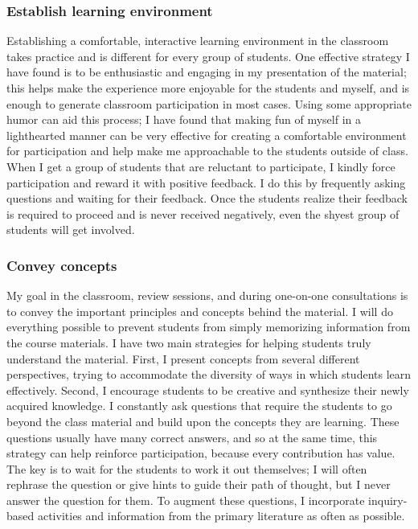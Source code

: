 \documentclass[10pt]{article}
\begin{document}
\subsubsection*{Establish learning environment}
Establishing a comfortable, interactive learning environment in the classroom takes practice and is different for every group of students.
One effective strategy I have found is to be enthusiastic and engaging in my presentation of the material; this helps make the experience more enjoyable for the students and myself, and is enough to generate classroom participation in most cases.
Using some appropriate humor can aid this process; I have found that making fun of myself in a lighthearted manner can be very effective for creating a comfortable environment for participation and help make me approachable to the students outside of class.
When I get a group of students that are reluctant to participate, I kindly force participation and reward it with positive feedback.
I do this by frequently asking questions and waiting for their feedback.
Once the students realize their feedback is required to proceed and is never received negatively, even the shyest group of students will get involved.

\subsubsection*{Convey concepts}
My goal in the classroom, review sessions, and during one-on-one consultations is to convey the important principles and concepts behind the material.
I will do everything possible to prevent students from simply memorizing information from the course materials.
I have two main strategies for helping students truly understand the material.
First, I present concepts from several different perspectives, trying to accommodate the diversity of ways in which students learn effectively.
Second, I encourage students to be creative and synthesize their newly acquired knowledge.
I constantly ask questions that require the students to go beyond the class material and build upon the concepts they are learning.
These questions usually have many correct answers, and so at the same time, this strategy can help reinforce participation, because every contribution has value.
The key is to wait for the students to work it out themselves; I will often rephrase the question or give hints to guide their path of thought, but I never answer the question for them.
To augment these questions, I incorporate inquiry-based activities and information from the primary literature as often as possible. 
\end{document}
